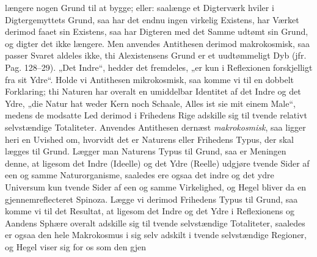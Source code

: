 \documentclass[12pt]{book}
\newcommand{\opage}[1]{\marginnote{\footnotesize\textit{[#1]}}}
\begin{document}
længere nogen Grund til at bygge; eller: saalænge et Digterværk hviler i Digtergemyttets
Grund, saa har det endnu ingen virkelig Existens, har Værket derimod faaet sin Existens,
saa har Digteren med det Samme udtømt sin Grund, og digter det ikke længere. Men anvendes
Antithesen derimod makrokosmisk, saa passer Svaret aldeles ikke, thi Alexistensens Grund
er et uudtømmeligt Dyb (jfr. Pag. 128--29). „Det Indre“, hedder det fremdeles, „er kun i
Reflexionen forskjelligt fra sit Ydre“. Holde vi Antithesen mikrokosmisk, saa komme vi til
en dobbelt Forklaring; thi Naturen har overalt en umiddelbar Identitet af det Indre og det
Ydre, „die Natur hat weder Kern noch Schaale, Alles ist sie mit einem Male“, medens de
modsatte Led derimod i Frihedens Rige adskille sig til tvende relativt selvstændige
Totaliteter. Anvendes Antithesen dernæst \emph{makrokosmisk}, saa ligger heri en Uvished
om, hvorvidt det er Naturens eller Frihedens Typus, der skal lægges til Grund. Lægger man
Naturens Typus til Grund, saa er Meningen denne, at ligesom det Indre (Ideelle) og det
Ydre (Reelle) udgjøre tvende Sider af een og samme Naturorganisme, saaledes ere ogsaa det
indre og det ydre Universum kun tvende Sider af een og samme Virkelighed, og Hegel bliver
da en gjennemreflecteret Spinoza. Lægge vi derimod Frihedens Typus til Grund, saa komme vi
til det Resultat, at ligesom det Indre og det Ydre i Reflexionens og Aandens Sphære
overalt adskille sig til tvende selvstændige Totaliteter, saaledes er ogsaa den hele
Makrokosmus i sig selv adskilt i tvende selvstændige Regioner, og Hegel viser sig for os
som den gjen%
\opage{192}%
\end{document}
